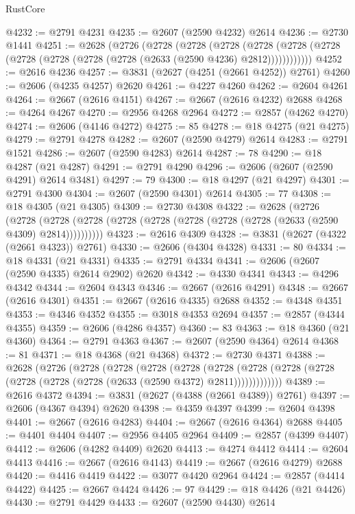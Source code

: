 \begin{lexlean}{RustCore}
\begin{coremodule}
@4232 := @2791 @4231
@4235 := @2607 (@2590 @4232) @2614
@4236 := @2730 @1441
@4251 := @2628
    (@2726
      (@2728
        (@2728
          (@2728
            (@2728 (@2728 (@2728 (@2728 (@2728 (@2728 (@2728 (@2633 (@2590 @4236) @2812))))))))))))
@4252 := @2616 @4236
@4257 := @3831 (@2627 (@4251 (@2661 @4252)) @2761)
@4260 := @2606 (@4235 @4257) @2620
@4261 := @4227 @4260
@4262 := @2604 @4261
@4264 := @2667 (@2616 @4151)
@4267 := @2667 (@2616 @4232) @2688
@4268 := @4264 @4267
@4270 := @2956 @4268 @2964
@4272 := @2857 (@4262 @4270)
@4274 := @2606 (@4146 @4272)
@4275 := 85
@4278 := @18 @4275 (@21 @4275)
@4279 := @2791 @4278
@4282 := @2607 (@2590 @4279) @2614
@4283 := @2791 @1521
@4286 := @2607 (@2590 @4283) @2614
@4287 := 78
@4290 := @18 @4287 (@21 @4287)
@4291 := @2791 @4290
@4296 := @2606 (@2607 (@2590 @4291) @2614 @3481)
@4297 := 79
@4300 := @18 @4297 (@21 @4297)
@4301 := @2791 @4300
@4304 := @2607 (@2590 @4301) @2614
@4305 := 77
@4308 := @18 @4305 (@21 @4305)
@4309 := @2730 @4308
@4322 := @2628
    (@2726
      (@2728 (@2728 (@2728 (@2728 (@2728 (@2728 (@2728 (@2728 (@2633 (@2590 @4309) @2814))))))))))
@4323 := @2616 @4309
@4328 := @3831 (@2627 (@4322 (@2661 @4323)) @2761)
@4330 := @2606 (@4304 @4328)
@4331 := 80
@4334 := @18 @4331 (@21 @4331)
@4335 := @2791 @4334
@4341 := @2606 (@2607 (@2590 @4335) @2614 @2902) @2620
@4342 := @4330 @4341
@4343 := @4296 @4342
@4344 := @2604 @4343
@4346 := @2667 (@2616 @4291)
@4348 := @2667 (@2616 @4301)
@4351 := @2667 (@2616 @4335) @2688
@4352 := @4348 @4351
@4353 := @4346 @4352
@4355 := @3018 @4353 @2694
@4357 := @2857 (@4344 @4355)
@4359 := @2606 (@4286 @4357)
@4360 := 83
@4363 := @18 @4360 (@21 @4360)
@4364 := @2791 @4363
@4367 := @2607 (@2590 @4364) @2614
@4368 := 81
@4371 := @18 @4368 (@21 @4368)
@4372 := @2730 @4371
@4388 := @2628
    (@2726
      (@2728
        (@2728
          (@2728
            (@2728
              (@2728
                (@2728 (@2728 (@2728 (@2728 (@2728 (@2728 (@2633 (@2590 @4372) @2811)))))))))))))
@4389 := @2616 @4372
@4394 := @3831 (@2627 (@4388 (@2661 @4389)) @2761)
@4397 := @2606 (@4367 @4394) @2620
@4398 := @4359 @4397
@4399 := @2604 @4398
@4401 := @2667 (@2616 @4283)
@4404 := @2667 (@2616 @4364) @2688
@4405 := @4401 @4404
@4407 := @2956 @4405 @2964
@4409 := @2857 (@4399 @4407)
@4412 := @2606 (@4282 @4409) @2620
@4413 := @4274 @4412
@4414 := @2604 @4413
@4416 := @2667 (@2616 @4143)
@4419 := @2667 (@2616 @4279) @2688
@4420 := @4416 @4419
@4422 := @3077 @4420 @2964
@4424 := @2857 (@4414 @4422)
@4425 := @2667 @4424
@4426 := 97
@4429 := @18 @4426 (@21 @4426)
@4430 := @2791 @4429
@4433 := @2607 (@2590 @4430) @2614

\end{coremodule}
\end{lexlean}
